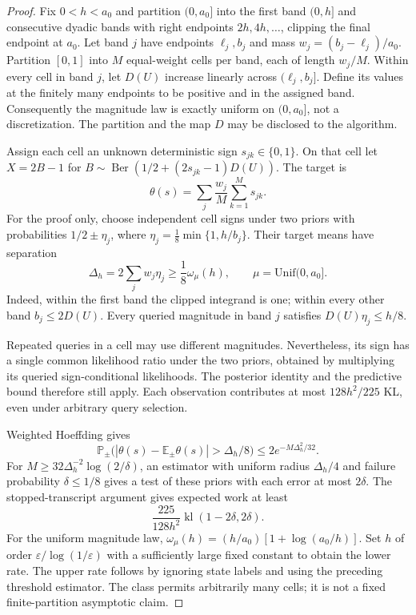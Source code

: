 \documentclass[11pt,a4paper]{article}
\theoremstyle{definition}
\newcommand{\E}{\mathbb E}
\newcommand{\Prob}{\mathbb P}
\newcommand{\kl}{\operatorname{kl}}
\newcommand{\Ber}{\operatorname{Ber}}
\begin{document}
\begin{proof}
Fix $0<h<a_0$ and partition $(0,a_0]$ into the first band $(0,h]$ and consecutive dyadic bands with right endpoints $2h,4h,\ldots$, clipping the final endpoint at $a_0$. Let band $j$ have endpoints $\ell_j,b_j$ and mass $w_j=(b_j-\ell_j)/a_0$. Partition $[0,1]$ into $M$ equal-weight cells per band, each of length $w_j/M$. Within every cell in band $j$, let $D(U)$ increase linearly across $(\ell_j,b_j]$. Define its values at the finitely many endpoints to be positive and in the assigned band. Consequently the magnitude law is exactly uniform on $(0,a_0]$, not a discretization. The partition and the map $D$ may be disclosed to the algorithm.

Assign each cell an unknown deterministic sign $s_{jk}\in\{0,1\}$. On that cell let $X=2B-1$ for $B\sim\Ber(1/2+(2s_{jk}-1)D(U))$. The target is
\[
\theta(s)=\sum_j\frac{w_j}{M}\sum_{k=1}^M s_{jk}.
\]
For the proof only, choose independent cell signs under two priors with probabilities $1/2\pm\eta_j$, where $\eta_j=\frac18\min\{1,h/b_j\}$. Their target means have separation
\[
\Delta_h=2\sum_jw_j\eta_j\ge\frac18\omega_\mu(h),\qquad \mu=\mathrm{Unif}(0,a_0].
\]
Indeed, within the first band the clipped integrand is one; within every other band $b_j\le2D(U)$. Every queried magnitude in band $j$ satisfies $D(U)\eta_j\le h/8$.

Repeated queries in a cell may use different magnitudes. Nevertheless, its sign has a single common likelihood ratio under the two priors, obtained by multiplying its queried sign-conditional likelihoods. The posterior identity and the predictive bound therefore still apply. Each observation contributes at most $128h^2/225$ KL, even under arbitrary query selection.

Weighted Hoeffding gives
\[
\Prob_\pm\bigl(|\theta(s)-\E_\pm\theta(s)|>\Delta_h/8\bigr)
\le2e^{-M\Delta_h^2/32}.
\]
For $M\ge32\Delta_h^{-2}\log(2/\delta)$, an estimator with uniform radius $\Delta_h/4$ and failure probability $\delta\le1/8$ gives a test of these priors with each error at most $2\delta$. The stopped-transcript argument gives expected work at least
\[
\frac{225}{128h^2}\kl(1-2\delta,2\delta).
\]
For the uniform magnitude law,
$\omega_\mu(h)=(h/a_0)[1+\log(a_0/h)]$. Set $h$ of order $\varepsilon/\log(1/\varepsilon)$ with a sufficiently large fixed constant to obtain the lower rate. The upper rate follows by ignoring state labels and using the preceding threshold estimator. The class permits arbitrarily many cells; it is not a fixed finite-partition asymptotic claim.


\end{proof}
\end{document}
